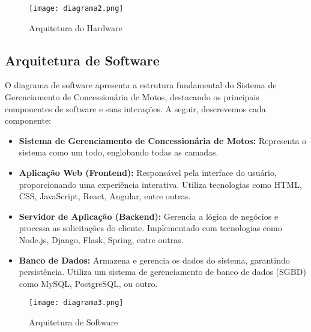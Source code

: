 \begin{figure}[h]
	\centering
	\texttt{[image: diagrama2.png]}
	\caption{Arquitetura do Hardware}
	\label{fig:diagrama1}
\end{figure}


    \subsection{Arquitetura de Software}

O diagrama de software apresenta a estrutura fundamental do Sistema de Gerenciamento de Concessionária de Motos, destacando os principais componentes de software e suas interações. A seguir, descrevemos cada componente:

\begin{itemize}
	\item \textbf{Sistema de Gerenciamento de Concessionária de Motos:} Representa o sistema como um todo, englobando todas as camadas.
	
	\item \textbf{Aplicação Web (Frontend):} Responsável pela interface do usuário, proporcionando uma experiência interativa. Utiliza tecnologias como HTML, CSS, JavaScript, React, Angular, entre outras.
	
	\item \textbf{Servidor de Aplicação (Backend):} Gerencia a lógica de negócios e processa as solicitações do cliente. Implementado com tecnologias como Node.js, Django, Flask, Spring, entre outras.
	
	\item \textbf{Banco de Dados:} Armazena e gerencia os dados do sistema, garantindo persistência. Utiliza um sistema de gerenciamento de banco de dados (SGBD) como MySQL, PostgreSQL, ou outro.
\end{itemize}

\begin{figure}[h]
	\centering
	\texttt{[image: diagrama3.png]}
	\caption{Arquitetura de Software}
	\label{fig:diagrama1}
\end{figure}

